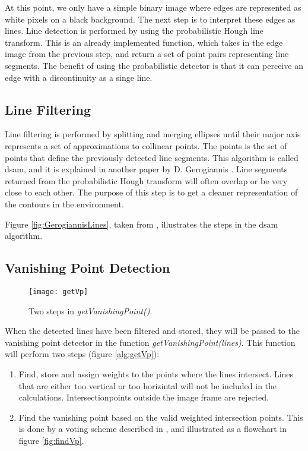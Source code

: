 At this point, we only have a simple binary image where edges are represented as white pixels on a black background. The next step is to interpret these edges as lines. Line detection is performed by using the probabilistic Hough line transform. This is an already implemented function, which takes in the edge image from the previous step, and return a set of point pairs representing line segments. The benefit of using the probabilistic detector is that it can perceive an edge with a discontinuity as a singe line. 

\subsection{Line Filtering}

Line filtering is performed by splitting and merging ellipses until their major axis represents a set of approximations to collinear points. The points is the set of points that define the previously detected line segments. This algorithm is called \gls{dsam}, and it is explained in another paper by D. Gerogiannis \cite{gerogiannisshape}. Line segments returned from the probabilistic Hough transform will often overlap or be very close to each other. The purpose of this step is to get a cleaner representation of the contours in the environment.

Figure \ref{fig:GerogiannisLines}, taken from \cite{gerogiannisvp}, illustrates the steps in the \gls{dsam} algorithm.

\subsection{Vanishing Point Detection}

\begin{wrapfigure}{r}{0.35\textwidth}
	\vspace{-10pt} %
	\centering
	\texttt{[image: getVp]}
	\caption{\label{fig:getVp}Two steps in \textit{getVanishingPoint()}.}
	\vspace{-60pt} %
\end{wrapfigure}


When the detected lines have been filtered and stored, they will be passed to the vanishing point detector in the function \textit{getVanishingPoint(lines)}. This function will perform two steps (figure \ref{alg:getVp}):

\begin{enumerate}
	\item Find, store and assign weights to the points where the lines intersect. Lines that are either too vertical or too horizintal will not be included in the calculations. Intersectionpoints outside the image frame are rejected.
	\item Find the vanishing point based on the valid weighted intersection points. This is done by a voting scheme described in \cite{gerogiannisvp}, and illustrated as a flowchart in figure \ref{fig:findVp}. 
\end{enumerate}

